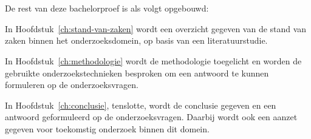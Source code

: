 \section{}%
\label{sec:opzet-bachelorproef}

De rest van deze bachelorproef is als volgt opgebouwd:

In Hoofdstuk~\ref{ch:stand-van-zaken} wordt een overzicht gegeven van de stand van zaken binnen het onderzoeksdomein, op basis van een literatuurstudie.

In Hoofdstuk~\ref{ch:methodologie} wordt de methodologie toegelicht en worden de gebruikte onderzoekstechnieken besproken om een antwoord te kunnen formuleren op de onderzoeksvragen.


In Hoofdstuk~\ref{ch:conclusie}, tenslotte, wordt de conclusie gegeven en een antwoord geformuleerd op de onderzoeksvragen. Daarbij wordt ook een aanzet gegeven voor toekomstig onderzoek binnen dit domein.